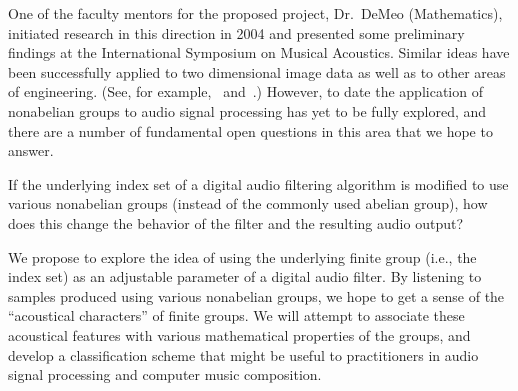 \documentclass[10pt]{article}
\begin{document}
One of the faculty mentors for the proposed project, Dr.~DeMeo
(Mathematics), initiated research in this direction in 2004 and presented some
preliminary findings at the International Symposium on Musical Acoustics.
Similar ideas have been successfully applied to two dimensional image data
as well as to other areas of
engineering. (See, for example,~\cite{Chirikjian:2002}
and~\cite{Tolimieri:2003}.)  However, to date the application of
nonabelian groups to audio signal processing has yet to be fully explored, and
there are a number of fundamental open questions in this area that we hope to
answer.  
 
\vskip5mm

If the underlying index set of a digital audio filtering algorithm is modified
to use various nonabelian groups (instead of the commonly used abelian group),
how does this change the behavior of the filter and the resulting audio output?

\vskip5mm

We propose to explore the idea of using the underlying finite group (i.e., the
index set) as an adjustable parameter of a digital audio filter.  By listening to
samples produced using various nonabelian groups, we hope to get a sense of the
``acoustical characters'' of finite groups.  We will attempt to associate these
acoustical features with various mathematical properties of the groups, and
develop a classification scheme that might be useful to
practitioners in audio signal processing and computer music composition.
\end{document}
